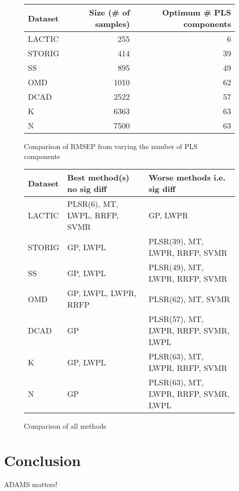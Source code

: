 \documentclass{llncs}
\begin{document}
\begin{itemize}
\begin{figure}[htb]
  \center
  \begin{tabular}{ l | r | r }
  \hline
  Dataset & Size (\# of samples) & Optimum \# PLS components \\
  \hline
  LACTIC & 255 & 6 \\
  STORIG & 414 & 39 \\
  SS & 895 & 49 \\
  OMD & 1010 & 62 \\
  DCAD & 2522 & 57 \\
  K & 6363 & 63 \\
  N & 7500 & 63 \\
  \hline
  \end{tabular}
  \caption{Comparison of RMSEP from varying the number of PLS components}
  \label{table_rmsep_pls}
\end{figure}

\begin{figure}[htb]
  \center
  \begin{tabular}{ l | l | l }
  \hline
  Dataset & Best method(s) no sig diff & Worse methods i.e. sig diff \\
  \hline
  LACTIC & PLSR(6), MT, LWPL, RRFP, SVMR & GP, LWPR \\
  STORIG & GP, LWPL & PLSR(39), MT, LWPR, RRFP, SVMR \\
  SS & GP, LWPL & PLSR(49), MT, LWPR, RRFP, SVMR \\
  OMD & GP, LWPL, LWPR, RRFP & PLSR(62), MT, SVMR \\
  DCAD & GP & PLSR(57), MT, LWPR, RRFP, SVMR, LWPL \\
  K & GP, LWPL & PLSR(63), MT, LWPR, RRFP, SVMR \\
  N & GP & PLSR(63), MT, LWPR, RRFP, SVMR, LWPL \\
  \hline
  \end{tabular}
  \caption{Comparison of all methods}
  \label{table_all_methods}
\end{figure}

\end{itemize}

\section{Conclusion}
ADAMS matters!
\end{document}
